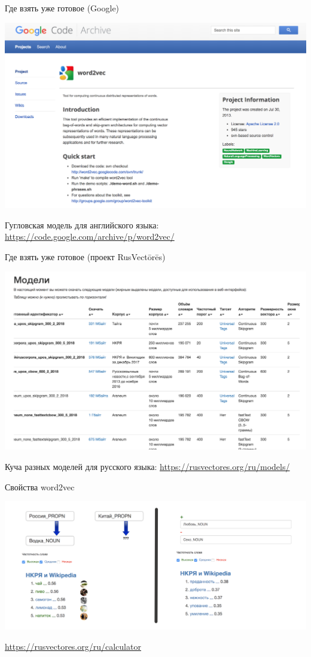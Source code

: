 \documentclass[notes,12pt, aspectratio=169]{beamer}
\begin{document}
\begin{frame}{Где взять уже готовое (Google)}
\begin{center}
	\includegraphics[width=.65\linewidth]{google_wv.png}
\end{center}

\vfill

\footnotesize Гугловская модель для английского языка:  {\color{blue} \url{https://code.google.com/archive/p/word2vec/}}
\end{frame} 


\begin{frame}{Где взять уже готовое (проект RusVectōrēs)}
\begin{center}
\includegraphics[width=.7\linewidth]{rusvec_models.png}
\end{center}

\vfill

\footnotesize Куча разных моделей для русского языка:  {\color{blue} \url{https://rusvectores.org/ru/models/}}
\end{frame} 


\begin{frame}{Свойства word2vec}
\begin{center}
\includegraphics[width=.85\linewidth]{rusvec_calc2.png}
\end{center}
\vfill
\footnotesize  {\color{blue} \url{https://rusvectores.org/ru/calculator}}
\end{frame} 
\end{document}
